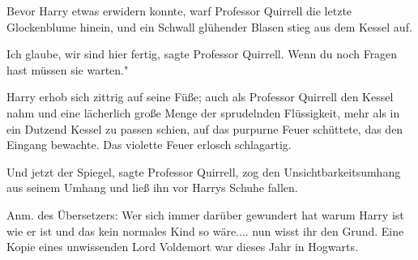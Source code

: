 Bevor Harry etwas erwidern konnte, warf Professor Quirrell die letzte
Glockenblume hinein, und ein Schwall glühender Blasen stieg aus dem Kessel auf.

\glqq Ich glaube, wir sind hier fertig\grqq{}, sagte Professor Quirrell. \glqq
Wenn du noch Fragen hast müssen sie warten."

Harry erhob sich zittrig auf seine Füße; auch als Professor Quirrell den Kessel
nahm und eine lächerlich große Menge der sprudelnden Flüssigkeit, mehr als in
ein Dutzend Kessel zu passen schien, auf das purpurne Feuer schüttete, das den
Eingang bewachte. Das violette Feuer erlosch schlagartig.

\glqq Und jetzt der Spiegel\grqq{}, sagte Professor Quirrell, zog den
Unsichtbarkeitsumhang aus seinem Umhang und ließ ihn vor Harrys Schuhe fallen.


Anm. des Übersetzers: Wer sich immer darüber gewundert hat warum Harry ist wie
er ist und das kein normales Kind so wäre.... nun wisst ihr den Grund. Eine
Kopie eines unwissenden Lord Voldemort war dieses Jahr in Hogwarts.

